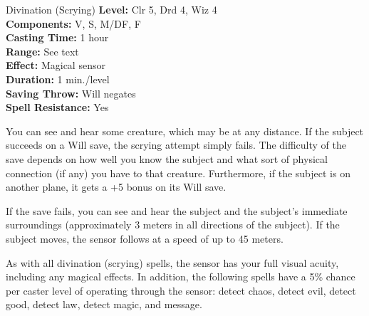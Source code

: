 {Divination (Scrying)}
{
	\textbf{Level:}
	Clr 5, Drd 4, Wiz 4\\
	\textbf{Components:}
	V, S, M/DF, F\\
	\textbf{Casting Time:}
	1 hour\\
	\textbf{Range:}
	See text\\
	\textbf{Effect:}
	Magical sensor\\
	\textbf{Duration:}
	1 min./level\\
	\textbf{Saving Throw:}
	Will negates\\
	\textbf{Spell Resistance:}
	Yes\\
}
{
	You can see and hear some creature, which may be at any distance. If the subject succeeds on a Will save, the scrying attempt simply fails. The difficulty of the save depends on how well you know the subject and what sort of physical connection (if any) you have to that creature. Furthermore, if the subject is on another plane, it gets a +5 bonus on its Will save.



	If the save fails, you can see and hear the subject and the subject's immediate surroundings (approximately 3 meters in all directions of the subject). If the subject moves, the sensor follows at a speed of up to 45 meters.

	As with all divination (scrying) spells, the sensor has your full visual acuity, including any magical effects. In addition, the following spells have a 5\% chance per caster level of operating through the sensor: detect chaos, detect evil, detect good, detect law, detect magic, and message.

}

